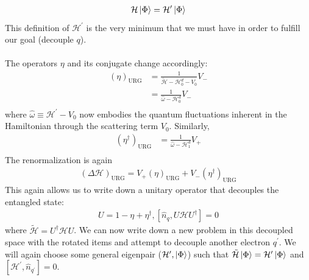 \documentclass[twoside]{report}
\numberwithin{equation}{section}
\begin{document}
\begin{equation}\begin{aligned}
\mathcal{H}\ket{\Phi} = \mathcal{H}^\prime \ket{\Phi}
\end{aligned}\end{equation}
This definition of \(\mathcal{H}^\prime\) is the very minimum that we must have in order to fulfill our goal (decouple \(q\)). 
\\\\The operators \(\eta\) and its conjugate change accordingly:
\begin{equation}\begin{aligned}
	\left(\eta\right)_\text{URG} &= \frac{1}{\tilde{\mathcal{H}} - \mathcal{H}^d_0 - V_0}V_-\\
     &= \frac{1}{\hat \omega - \mathcal{H}^d_0}V_-\\
\end{aligned}\end{equation}
where \(\hat \omega \equiv \mathcal{H}^\prime - V_0\) now embodies the quantum fluctuations inherent in the Hamiltonian through the scattering term \(V_0\). Similarly,
\begin{equation}\begin{aligned}
	\left(\eta^\dagger\right)_\text{URG} &= \frac{1}{\hat \omega - \mathcal{H}^d_1}V_+\\
\end{aligned}\end{equation}
The renormalization is again
\begin{equation}\begin{aligned}
	\left(\Delta \mathcal{H}\right)_\text{URG} = V_+\left(\eta\right)_\text{URG} + V_-\left(\eta^\dagger\right)_\text{URG}
\end{aligned}\end{equation}
This again allows us to write down a unitary operator that decouples the entangled state:
\begin{equation}\begin{aligned}
	U =  1 - \eta + \eta^\dagger, \left[\hat n_q, U \mathcal{H} U^\dagger\right] = 0
\end{aligned}\end{equation}
where \(\tilde{\mathcal{H}} = U^\dagger \mathcal{H} U\). We can now write down a new problem in this decoupled space with the rotated items and attempt to decouple another electron \(q^\prime\). We will again choose some general eigenpair (\(\mathcal{H}^\prime,\ket{\Phi}\)) such that \(\tilde{\mathcal{H}}\ket{\Phi} = \mathcal{H}^{\prime}\ket{\Phi}\) and \(\left[\mathcal{H}^{\prime},\hat n_{q^\prime}\right]=0\).
\end{document}
